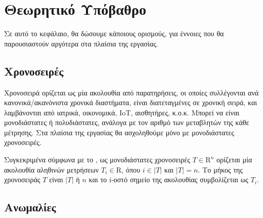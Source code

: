 
\chapter{Θεωρητικό Υπόβαθρο} %

\label{Chapter2} %




Σε αυτό το κεφάλαιο, θα δώσουμε κάποιους ορισμούς, για έννοιες που θα παρουσιαστούν αργότερα στα πλαίσια της εργασίας.


\section{Χρονοσειρές}

Χρονοσειρά ορίζεται ως μία ακολουθία από παρατηρήσεις, οι οποίες συλλέγονται ανά κανονικά/ακανόνιστα χρονικά διαστήματα, είναι διατεταγμένες σε χρονική σειρά, και λαμβάνονται από ιατρικά, οικονομικά, IoT, αισθητήρες, κ.ο.κ. Μπορεί να είναι μονοδιάστατες ή πολυδιάστατες, ανάλογα με τον αριθμό των μεταβλητών της κάθε μέτρησης. Στα πλαίσια της εργασίας θα ασχοληθούμε μόνο με μονοδιάστατες χρονοσειρές.

Συγκεκριμένα σύμφωνα με το \cite[Section 3.1]{schmidl2024autotsad}, ως μονοδιάστατες χρονοσειρές $T \in \mathrm{R}^n$ ορίζεται μία ακολουθία αληθινών μετρήσεων $T_i \in \mathrm{R}$, όπου $i \in |T|$ και $|T| = n$. Το μήκος της χρονοσειράς $T$ είναι $|T|$ ή $n$ και το i-οστό σημείο της ακολουθίας συμβολίζεται ως $T_i$.


\section{Ανωμαλίες}

